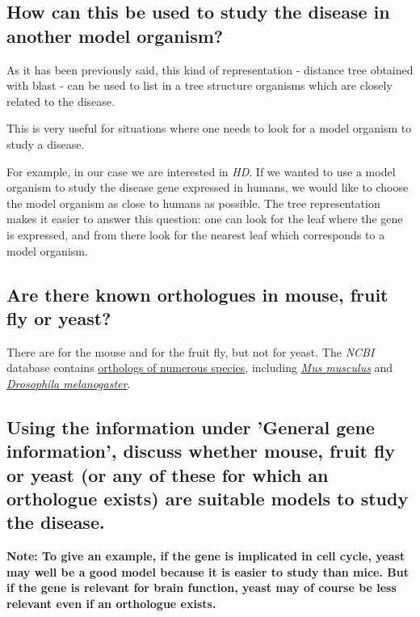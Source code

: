 
\subsection{How can this be used to study the disease in another model organism?}

As it has been previously said, this kind of representation - distance tree obtained with blast - can be used to list in a tree structure organisms which are closely related to the disease.

This is very useful for situations where one needs to look for a model organism to study a disease.

For example, in our case we are interested in \textit{HD}. If we wanted to use a model organism to study the disease gene expressed in humans, we would like to choose the model organism as close to humans as possible. The tree representation makes it easier to answer this question: one can look for the leaf where the gene is expressed, and from there look for the nearest leaf which corresponds to a model organism.


\subsection{Are there known orthologues in mouse, fruit fly or yeast?}

There are for the mouse and for the fruit fly, but not for yeast. The \textit{NCBI} database contains \href{https://www.ncbi.nlm.nih.gov/gene/?Term=ortholog_gene_3064[group]}{orthologs of numerous species}, including \href{https://www.ncbi.nlm.nih.gov/gene/15194}{\textit{Mus musculus}} and \href{https://www.ncbi.nlm.nih.gov/gene/43392}{\textit{Drosophila melanogaster}}.



\subsection{Using the information under 'General gene information', discuss whether mouse, fruit fly or yeast (or any of these for which an orthologue exists) are suitable models to study the disease.}

\textbf{Note: To give an example, if the gene is implicated in cell cycle, yeast may well be a good model because it is easier to study than mice. But if the gene is relevant for brain function, yeast may of course be less relevant even if an orthologue exists.}

